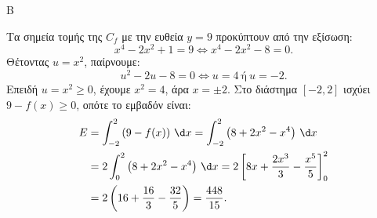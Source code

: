 \begin{thema}{Β}
\begin{erwthma}
\item Τα σημεία τομής της $C_f$ με την ευθεία $y=9$ προκύπτουν από την εξίσωση:
\[ x^4-2x^2+1=9 \Leftrightarrow x^4-2x^2-8=0. \]
Θέτοντας $u=x^2$, παίρνουμε:
\[ u^2-2u-8=0 \Leftrightarrow u=4 \ \text{ή}\ u=-2. \]
Επειδή $u=x^2\ge0$, έχουμε $x^2=4$, άρα $x=\pm2$.
Στο διάστημα $[-2,2]$ ισχύει $9-f(x)\ge0$, οπότε το εμβαδόν είναι:
\begin{align*}
E&=\int_{-2}^{2}\left(9-f(x)\right)\,\d x
=\int_{-2}^{2}\left(8+2x^2-x^4\right)\,\d x\\
&=2\int_0^2\left(8+2x^2-x^4\right)\,\d x
=2\left[8x+\frac{2x^3}{3}-\frac{x^5}{5}\right]_0^2\\
&=2\left(16+\frac{16}{3}-\frac{32}{5}\right)=\frac{448}{15}.
\end{align*}
\end{erwthma}
\end{thema}

